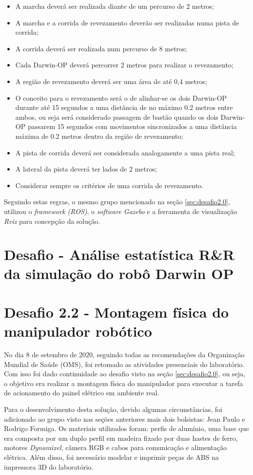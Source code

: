 \begin{itemize}
  \item A marcha deverá ser realizada diante de um percurso de 2 metros;
  \item A marcha e a corrida de revezamento deverão ser realizadas numa pista de corrida;
  \item A corrida deverá ser realizada num percurso de 8 metros;
  \item Cada Darwin-OP deverá percorrer 2 metros para realizar o revezamento;
  \item A região de revezamento deverá ser uma área de até 0,4 metros;
  \item O conceito para o revezamento será o de alinhar-se os dois Darwin-OP durante até 15 segundos a uma distância de no máximo 0.2 metros entre ambos, ou seja será considerado passagem de bastão quando os dois Darwin-OP passarem 15 segundos com movimentos sincronizados a uma distância máxima de 0.2 metros dentro da
  região de revezamento;
  \item A pista de corrida deverá ser considerada analogamente a uma pista real;
  \item A lateral da pista deverá ter lados de 2 metros;
  \item Considerar sempre os critérios de uma corrida de revezamento.
\end{itemize}

Seguindo estas regras, o mesmo grupo mencionado na seção \ref{sec:desafio2.0}, utilizou o \textit{framework (ROS)}, o \textit{software {Gazebo}} e a ferramenta de visualização \textit{Rviz} para concepção da solução.

\section{Desafio - Análise estatística R\&R da simulação do robô Darwin OP}
\label{sec:estudo_estatisticoRR}



\section{Desafio 2.2 - Montagem física do manipulador robótico}
\label{sec:desafio2.2}

No dia 8 de setembro de 2020, seguindo todas as recomendações da Organização Mundial de Saúde (OMS), foi retomado as atividades presenciais do laboratório. Com isso foi dado continuidade ao desafio visto na seção \ref{sec:desafio2.0}, ou seja, o objetivo era realizar a montagem física do manipulador para executar a tarefa de acionamento do painel elétrico em ambiente real.

Para o desenvolvimento desta solução, devido algumas circunstâncias, foi adicionado ao grupo visto nas seções anteriores mais dois bolsistas: Jean Paulo e Rodrigo Formiga. Os materiais utilizados foram: perfis de alumínio, uma base que era composta por um duplo perfil em madeira fixado por duas hastes de ferro, motores \textit{Dynamixel}, câmera RGB e cabos para comunicação e alimentação elétrica. Além disso, foi necessário modelar e imprimir peças de ABS na impressora 3D do laboratório.



